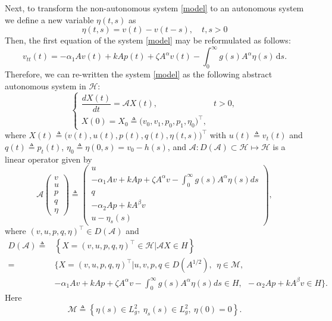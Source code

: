 \documentclass[12pt,reqno]{article}
\begin{document}
	Next, to transform the non-autonomous system \eqref{model} to an autonomous system we define a new variable $\eta(t,s)$ as
	\[
	\eta(t,s) = v(t) - v(t-s), \quad t,s>0
	\]
	Then, the first equation of the system \eqref{model} may be reformulated as follows:
	$$v_{tt}(t) = -\alpha_1 A v(t) + k A p(t)+ \zeta A^\alpha v(t) - \int_{0}^{\infty} g(s) A^\alpha \eta(s) \,\mathrm{d}s.$$
	Therefore, we can re-written the system \eqref{model} as the following abstract autonomous system in $\mathcal{H}$:
	\begin{equation}\label{modelmain}
		\begin{cases}
			\dfrac{dX(t)}{dt}=\mathcal{A} X(t), & t>0, \\
			X(0)=X_0\triangleq \big(v_0,v_1,p_0,p_1,\eta_0\big)^\top,
		\end{cases}
	\end{equation}
	where $X(t)\triangleq\big(v(t),u(t),p(t),q(t),\eta(t,s)\big)^\top$ with $u(t)\triangleq v_t(t)$ and $q(t)\triangleq p_t(t)$, $\eta_0\triangleq\eta(0,s)=v_0-h(s)$, and $\mathcal{A}:D(\mathcal{A})\subset \mathcal{H}\mapsto\mathcal{H}$ is a linear operator given by
	\begin{equation}\label{dfA}
		\mathcal{A}\begin{pmatrix} v \\ u \\ p \\ q \\ \eta \end{pmatrix}
		\triangleq
		\begin{pmatrix}
			u \\
			-\alpha_1 A v+k Ap+\zeta A^\alpha v-\int_0^\infty g(s) A^\alpha \eta(s) ds \\
			q \\
			-\alpha_2 A p+k A^\beta v \\
			u-\eta_s(s)
		\end{pmatrix},
	\end{equation}
	where $(v,u,p,q,\eta)^\top\in D(\mathcal{A})$ and
	\begin{align*}
D(\mathcal{A})\triangleq&\left\{X=(v,u,p,q,\eta)^\top\in\mathcal{H}\bigg|\mathcal{A}X\in H\right\}\\
		=&\Bigg\{X=(v,u,p,q,\eta)^\top \bigg| u,v,p,q\in D(A^{1/2}),~~\eta\in \mathcal{M},\\
		&-\alpha_1 A v+k A p+\zeta A^\alpha v-\int_0^\infty g(s) A^\alpha \eta(s) ds \in H,~~-\alpha_2 A p+k A^\beta v\in H \Bigg\}.
	\end{align*}
	Here
	\[
	\mathcal{M}\triangleq \left\{ \eta(s)\in L_g^2,\ \eta_s(s)\in L_g^2,\ \eta(0)=0 \right\}.
	\]
\end{document}
